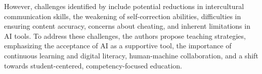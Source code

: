 However, challenges identified by \textcite[p.~83]{huang2023} include
potential reductions in intercultural communication skills, the
weakening of self-correction abilities, difficulties in ensuring content
accuracy, concerns about cheating, and inherent limitations in AI tools.
To address these challenges, the authors propose teaching strategies,
emphasizing the acceptance of AI as a supportive tool, the importance of
continuous learning and digital literacy, human-machine collaboration,
and a shift towards student-centered, competency-focused education.
